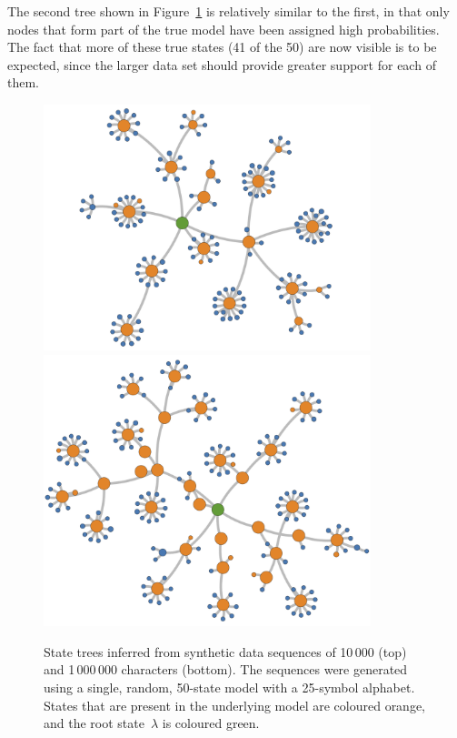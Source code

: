 \documentclass[11pt,a4paper]{article}
\begin{document}
The second tree shown in Figure~\ref{fig:25-character model} is relatively
similar to the first, in that only nodes that form part of the true model have
been assigned high probabilities. The fact that more of these true states (41 of
the 50) are now visible is to be expected, since the larger data set should
provide greater support for each of them.
%
\begin{figure}[htbp]
\centering
  \includegraphics[width=0.85\textwidth]{figures/synthetic 1}
  \includegraphics[width=0.85\textwidth]{figures/synthetic 2}
\caption{State trees inferred from synthetic data sequences of 10\,000 (top) and
  1\,000\,000 characters (bottom). The sequences were generated using a single,
  random, 50-state model with a 25-symbol alphabet. States that are present in
  the underlying model are coloured orange, and the root state~\(\lambda\) is
  coloured green.}
\label{fig:25-character model}
\end{figure}
\end{document}
